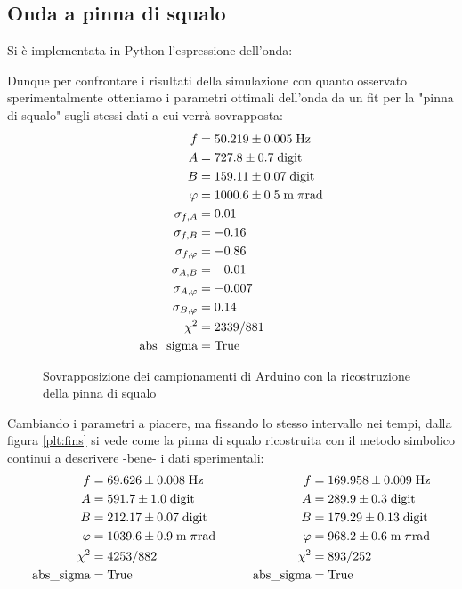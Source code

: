 \documentclass{article}[a4paper, oneside ,11pt]
\begin{document}
\subsection{Onda a pinna di squalo}
Si è implementata in Python l'espressione dell'onda:

Dunque per confrontare i risultati della simulazione con quanto osservato sperimentalmente otteniamo i parametri ottimali dell'onda da un fit per la "pinna di squalo" sugli stessi dati a cui verrà sovrapposta:\\
\begin{align*}
f &= 50.219 \pm 0.005 \; \rm Hz \\
A &= 727.8 \pm 0.7 \; \rm digit \\
B &= 159.11 \pm 0.07 \; \rm digit \\
\varphi &= 1000.6 \pm 0.5 \; \mathrm{m}\; \pi \si{\radian} \\
\sigma_{f, A} &= 0.01 \\   
\sigma_{f, B} &= -0.16 \\
\sigma_{f, \varphi} &= -0.86 \\
\sigma_{A, B} &= -0.01 \\
\sigma_{A, \varphi} &= -0.007 \\   
\sigma_{B, \varphi} &= 0.14 \\
\chi^2 &= 2339/881 \\
\text{abs\_sigma} &= \rm True
\end{align*}
\begin{figure}[!htb]
	\centering 
 		\scalebox{0.9}{}
 	\caption{Sovrapposizione dei campionamenti di Arduino con la ricostruzione della pinna di squalo \label{plt:ardfin}}
\end{figure}
Cambiando i parametri a piacere, ma fissando lo stesso intervallo nei tempi, dalla figura \ref{plt:fins} si vede come la pinna di squalo ricostruita con il metodo simbolico continui a descrivere -bene- i dati sperimentali:
\begin{align*}
f &= 69.626 \pm 0.008 \; \rm Hz  \qquad &f &= 169.958 \pm 0.009 \; \rm Hz \\
A &= 591.7 \pm 1.0 \; \rm digit \qquad &A &= 289.9 \pm 0.3 \; \rm digit \\
B &= 212.17 \pm 0.07 \; \rm digit \qquad &B &= 179.29 \pm 0.13 \; \rm digit \\
\varphi &= 1039.6 \pm 0.9 \; \mathrm{m}\; \pi \si{\radian} \qquad &\varphi &= 968.2 \pm 0.6 \; \mathrm{m}\; \pi \si{\radian} \\
\chi^2 &= 4253/882 \qquad &\chi^2 &= 893/252 \\
\text{abs\_sigma} &= \rm True \qquad &\text{abs\_sigma} &= \rm True
\end{align*}
\end{document}
